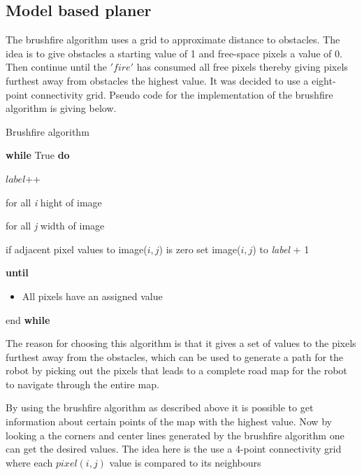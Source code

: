 \documentclass[../Head/Main.tex]{subfiles}
\begin{document}
\subsection{Model based planer}

The brushfire algorithm uses a grid to approximate distance to obstacles. The idea is to give obstacles a starting value of 1 and free-space pixels a value of 0. Then continue until the $'fire'$ has consumed all free pixels thereby giving pixels furthest away from obstacles the highest value. It was decided to use a eight-point connectivity grid. Pseudo code for the implementation of the brushfire algorithm is giving below.          

\begin{Pseudo}{Brushfire algorithm}{}

	\textbf{while} True \textbf{do}
	

	\begin{Indentation}
	\item $label$++
	\begin{Indentation}

	\item for all \textit{i} hight of image 
	\begin{Indentation}
	\item for all \textit{j} width of image 
	\item if adjacent pixel values to image($i, j $) is zero set image($i, j $) to \textit{label} + 1	
	
	\end{Indentation}
	
	\item \textbf{until}
				
	\begin{itemize}
	\item All pixels have an assigned value 
	\end{itemize}

	\end{Indentation}
	
	 \item end \textbf{while}

	\end{Indentation}
	
\end{Pseudo}

The reason for choosing this algorithm is that it gives a set of values to the pixels furthest away from the obstacles, which can be used to generate a path for the robot by picking out the pixels that leads to a complete road map for the robot to navigate through the entire map. 
\item 
By using the brushfire algorithm as described above it is possible to get information about certain points of the map with the highest value. Now by looking a the corners and center lines generated by the brushfire algorithm one can get the desired values. The idea here is the use a 4-point connectivity grid where each $pixel(i,j)$ value is compared to its neighbours   
\end{document}
